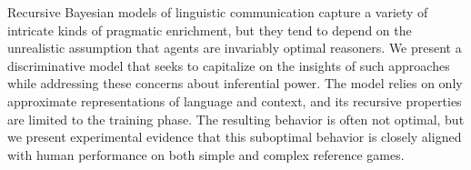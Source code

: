 Recursive Bayesian models of linguistic communication capture a
variety of intricate kinds of pragmatic enrichment, but they tend to
depend on the unrealistic assumption that agents are invariably
optimal reasoners. We present a discriminative model that seeks to
capitalize on the insights of such approaches while addressing these
concerns about inferential power. The model relies on only approximate
representations of language and context, and its recursive properties
are limited to the training phase. The resulting behavior is often not
optimal, but we present experimental evidence that this suboptimal
behavior is closely aligned with human performance on both simple and
complex reference games.
